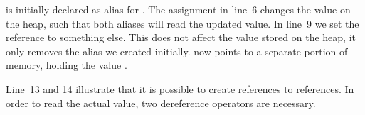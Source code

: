  is initially declared as alias for .
The assignment in line~6 changes the value on the heap, such that both aliases will read the updated value.
In line~9 we set the reference to something else.
This does not affect the value stored on the heap, it only removes the alias we created initially.
 now points to a separate portion of memory, holding the value .

Line~13 and 14 illustrate that it is possible to create references to references.
In order to read the actual value, two dereference operators are necessary.
